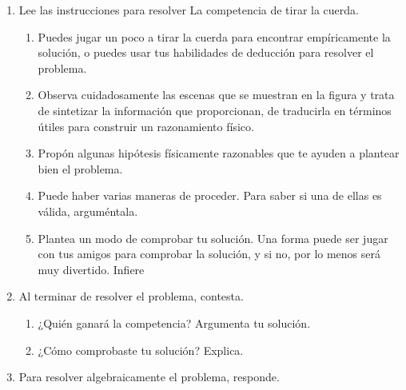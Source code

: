 \documentclass[11pt]{book}
\begin{document}
\begin{boxK}
\begin{enumerate}
    \end{enumerate}

\end{boxK}

\newpage

\begin{boxK}
    \begin{enumerate}\addtocounter{enumi}{2}
        \item Lee las instrucciones para resolver La competencia de tirar la cuerda.
              \begin{enumerate}
                  \item Puedes jugar un poco a tirar la cuerda para encontrar empíricamente la
                        solución, o puedes usar tus habilidades de deducción para resolver el
                        problema.
                  \item Observa cuidadosamente las escenas que se muestran en la figura y trata
                        de sintetizar la información que proporcionan, de traducirla en términos
                        útiles para construir un razonamiento físico.
                  \item Propón algunas hipótesis físicamente razonables que te ayuden a plantear
                        bien el problema.
                  \item Puede haber varias maneras de proceder. Para saber si una de ellas es
                        válida, arguméntala.
                  \item Plantea un modo de comprobar tu solución. Una forma puede ser jugar
                        con tus amigos para comprobar la solución, y si no, por lo menos será muy
                        divertido.
                        Infiere
              \end{enumerate}

        \item Al terminar de resolver el problema, contesta.
              \begin{enumerate}
                  \item ¿Quién ganará la competencia? Argumenta tu solución.
                  \item ¿Cómo comprobaste tu solución? Explica.
              \end{enumerate}

        \item Para resolver algebraicamente el problema, responde.


\end{enumerate}
\end{boxK}
\end{document}
